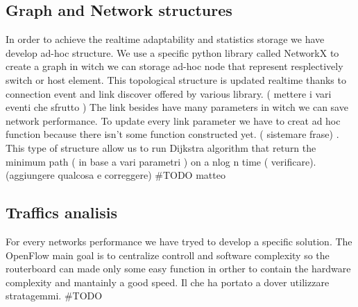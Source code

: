 \documentclass[conference,10pt]{IEEEtran}
\begin{document}
  \subsection{Graph and Network structures}
  In order to achieve the realtime adaptability and statistics storage we have develop ad-hoc structure.
  We use a specific python library called NetworkX \cite{networkx} to create a graph in witch we can storage ad-hoc node that represent
  resplectively switch or host element.
  This topological structure is updated realtime thanks to connection event and link discover offered by various library.
  ( mettere i vari eventi che sfrutto )
  The link besides have many parameters in witch we can save network performance. To update every link parameter we have to creat ad hoc function
  because there isn't some function constructed yet. ( sistemare frase) .
  This type of structure allow us to run Dijkstra algorithm that return the minimum path ( in base a vari parametri ) on a nlog n time ( verificare).
  (aggiungere qualcosa e correggere)
  \#TODO matteo

  \subsection{Traffics analisis}\label{subsec:traf}
  For every networks performance we have tryed to develop a specific solution. The OpenFlow main goal is to centralize controll and software
  complexity so the routerboard can made only some easy function in orther to contain the hardware complexity and mantainly a good speed\cite{qos_paper}.
  Il che ha portato a dover utilizzare stratagemmi.
  \#TODO %
\end{document}
